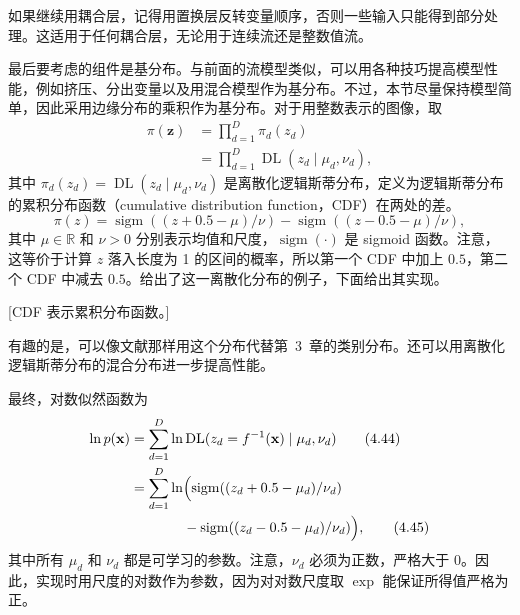 如果继续用耦合层，记得用置换层反转变量顺序，否则一些输入只能得到部分处理。这适用于任何耦合层，无论用于连续流还是整数值流。

最后要考虑的组件是基分布。与前面的流模型类似，可以用各种技巧提高模型性能，例如挤压、分出变量以及用混合模型作为基分布。不过，本节尽量保持模型简单，因此采用边缘分布的乘积作为基分布。对于用整数表示的图像，取
\begin{align}
\pi(\mathbf{z})&=\prod_{d=1}^D\pi_d(z_d)
\tag{4.41}\label{eq:04-41}\\
&=\prod_{d=1}^D\operatorname{DL}(z_d\mid\mu_d,\nu_d),
\tag{4.42}\label{eq:04-42}
\end{align}
其中 $\pi_d(z_d)=\operatorname{DL}(z_d\mid\mu_d,\nu_d)$ 是离散化逻辑斯蒂分布，定义为逻辑斯蒂分布的累积分布函数（cumulative distribution function，CDF）在两处的差。
\begin{equation}
\pi(z)=\operatorname{sigm}((z+0.5-\mu)/\nu)-\operatorname{sigm}((z-0.5-\mu)/\nu),
\tag{4.43}\label{eq:04-43}
\end{equation}
其中 $\mu\in\mathbb{R}$ 和 $\nu>0$ 分别表示均值和尺度，$\operatorname{sigm}(\cdot)$ 是 sigmoid 函数。注意，这等价于计算 $z$ 落入长度为 1 的区间的概率，所以第一个 CDF 中加上 $0.5$，第二个 CDF 中减去 $0.5$。给出了这一离散化分布的例子，下面给出其实现。

[CDF 表示累积分布函数。]

有趣的是，可以像文献那样用这个分布代替第~3~章的类别分布。还可以用离散化逻辑斯蒂分布的混合分布进一步提高性能。


最终，对数似然函数为
\begin{align}
\ln p(\mathbf{x})
&=\sum_{d=1}^D\ln\operatorname{DL}(z_d=f^{-1}(\mathbf{x})\mid\mu_d,\nu_d)
\tag{4.44}\label{eq:04-44}\\
&=\sum_{d=1}^D\ln\Bigl(\operatorname{sigm}((z_d+0.5-\mu_d)/\nu_d)
\notag\\
&\hspace{3.8em}{}-\operatorname{sigm}((z_d-0.5-\mu_d)/\nu_d)\Bigr),
\tag{4.45}\label{eq:04-45}
\end{align}
其中所有 $\mu_d$ 和 $\nu_d$ 都是可学习的参数。注意，$\nu_d$ 必须为正数，严格大于 0。因此，实现时用尺度的对数作为参数，因为对对数尺度取 $\exp$ 能保证所得值严格为正。

